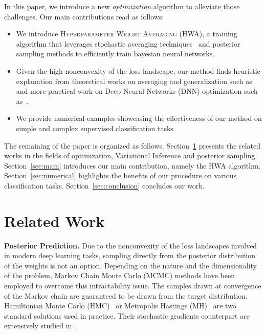 \documentclass[tablecaption=bottom,wcp]{jmlr}
\begin{document}
In this paper, we introduce a new \emph{optimization} algorithm to alleviate those challenges.
Our main contributions read as follows:
\begin{itemize}
\item We introduce \textsc{Hyperparameter Weight Averaging} (HWA), a training algorithm that leverages stochastic averaging techniques~\citep{polyak1992acceleration} and posterior sampling methods to efficiently train bayesian neural networks.
\item Given the high nonconvexity of the loss landscape, our method finds heuristic explanation from theoretical works on averaging and generalization such as~\citep{keskar2016large,he2019asymmetric} and more practical work on Deep Neural Networks (DNN) optimization such as~\citep{izmailov2018averaging}.
\item We provide numerical examples showcasing the effectiveness of our method on simple and complex supervised classification tasks.
\end{itemize}
The remaining of the paper is organized as follows.
Section~\ref{sec:related} presents the related works in the fields of optimization, Variational Inference and posterior sampling.
Section~\ref{sec:main} introduces our main contribution, namely the HWA algorithm.
Section~\ref{sec:numerical} highlights the benefits of our procedure on various classification tasks.
Section~\ref{sec:conclusion} concludes our work.
 
\section{Related Work}\label{sec:related}

\textbf{Posterior Prediction.}
Due to the nonconvexity of the loss landscapes involved in modern deep learning tasks, sampling directly from the posterior distribution of the weights is not an option.
Depending on the nature and the dimensionality of the problem, Markov Chain Monte Carlo (MCMC) methods have been employed to overcome this intractability issue.
The samples drawn at convergence of the Markov chain are guaranteed to be drawn from the target distribution.
Hamiltonian Monte Carlo (HMC)~\citep{neal2011mcmc} or Metropolis Hastings (MH)~\citep{hastings1970monte} are two standard solutions used in practice.
Their stochastic gradients counterpart are extensively studied in \citep{ma2015complete}.
\end{document}
